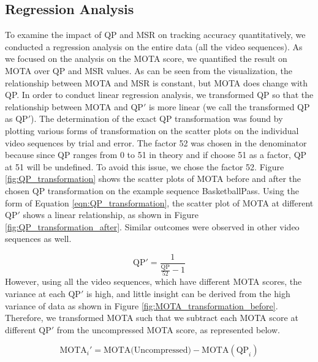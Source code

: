 \subsection{Regression Analysis}
\label{subsec:/results/section_a/regression_analysis}
To examine the impact of QP and MSR on tracking accuracy quantitatively, we conducted a regression analysis on the entire data (all the video sequences). As we focused on the analysis on the MOTA score, we quantified the result on MOTA over QP and MSR values. As can be seen from the visualization, the relationship between MOTA and MSR is constant, but MOTA does change with QP. In order to conduct linear regression analysis, we transformed QP so that the relationship between MOTA and $\text{QP}'$ is more linear (we call the transformed QP as $\text{QP}'$). The determination of the exact QP transformation was found by plotting various forms of transformation on the scatter plots on the individual video sequences by trial and error. The factor 52 was chosen in the denominator because since QP ranges from 0 to 51 in theory \cite{sullivan_overview_2012} and if choose 51 as a factor, QP at 51 will be undefined. To avoid this issue, we chose the factor 52. Figure \ref{fig:QP_transformation} shows the scatter plots of MOTA before and after the chosen QP transformation on the example sequence BasketballPass. Using the form of Equation \eqref{eqn:QP_transformation}, the scatter plot of MOTA at different $\text{QP}'$ shows a linear relationship, as shown in Figure \ref{fig:QP_transformation_after}. Similar outcomes were observed in other video sequences as well.

\begin{equation}
\text{QP}' =  \frac{1}{\frac{\text{QP}}{52}-1}
\label{eqn:QP_transformation}
\end{equation}
However, using all the video sequences, which have different MOTA scores, the variance at each $\text{QP}'$ is high, and little insight can be derived from the high variance of data as shown in Figure \ref{fig:MOTA_transformation_before}. Therefore, we transformed MOTA such that we subtract each MOTA score at different $\text{QP}'$ from the uncompressed MOTA score, as represented below.

\begin{equation}
\text{MOTA}_i' = \text{MOTA(Uncompressed)} -  \text{MOTA}(\text{QP}_i)
\label{eqn:MOTA_transformation}
\end{equation}
